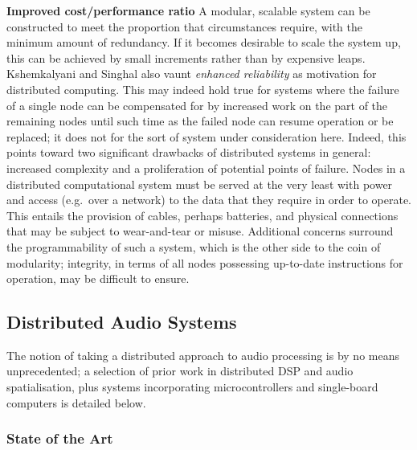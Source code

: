 \textbf{Improved cost/performance ratio}
A modular, scalable system can be constructed to meet the proportion that
circumstances require, with the minimum amount of redundancy.
If it becomes desirable to scale the system up, this can be achieved by small
increments rather than by expensive leaps.\\

Kshemkalyani and Singhal also vaunt \textit{enhanced reliability} as motivation
for distributed computing.
This may indeed hold true for systems where the failure of a single node can be
compensated for by increased work on the part of the remaining nodes until such
time as the failed node can resume operation or be replaced;
it does not for the sort of system under consideration here.
Indeed, this points toward two significant drawbacks of distributed systems in
general: increased complexity and a proliferation of potential points of
failure.
Nodes in a distributed computational system must be served at the very least
with power and access (e.g.\ over a network) to the data that they require in
order to operate.
This entails the provision of cables, perhaps batteries, and physical
connections that may be subject to wear-and-tear or misuse.
Additional concerns surround the programmability of such a system, which is the
other side to the coin of modularity;
integrity, in terms of all nodes possessing up-to-date instructions for
operation, may be difficult to ensure.

\subsection{Distributed Audio Systems}\label{subsec:distributed-audio-systems}

The notion of taking a distributed approach to audio processing is by no means
unprecedented;
a selection of prior work in distributed DSP and audio spatialisation, plus
systems incorporating microcontrollers and single-board computers is detailed
below.

\subsubsection{State of the Art}

